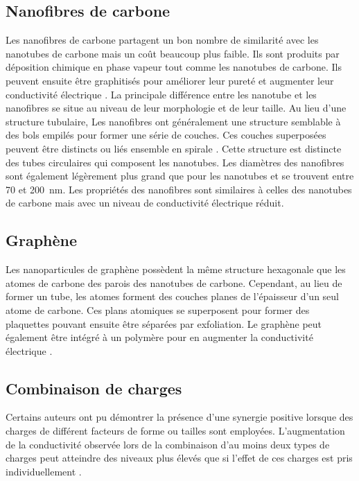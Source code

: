 \subsection{Nanofibres de carbone}

Les nanofibres de carbone partagent un bon nombre de similarité avec les nanotubes de carbone mais un coût beaucoup plus faible. 
Ils sont produits par déposition chimique en phase vapeur tout comme les nanotubes de carbone. 
Ils peuvent ensuite être graphitisés pour améliorer leur pureté et augmenter leur conductivité électrique \cite{Al-Saleh2009c}. 
La principale différence entre les nanotube et les nanofibres se situe au niveau de leur morphologie et de leur taille. 
Au lieu d'une structure tubulaire, Les nanofibres ont généralement une structure semblable à des bols empilés pour former une série de couches. 
Ces couches superposées peuvent être distincts ou liés ensemble en spirale \cite{Al-Saleh2009c}. 
Cette structure est distincte des tubes circulaires qui composent les nanotubes. 
Les diamètres des nanofibres sont également légèrement plus grand que pour les nanotubes et se trouvent entre 70 et \SI{200}{\nano\metre}. 
Les propriétés des nanofibres sont similaires à celles des nanotubes de carbone mais avec un niveau de conductivité électrique réduit. 

\subsection{Graphène}

Les nanoparticules de graphène possèdent la même structure hexagonale que les atomes de carbone des parois des nanotubes de carbone. 
Cependant, au lieu de former un tube, les atomes forment des couches planes de l'épaisseur d'un seul atome de carbone. 
Ces plans atomiques se superposent pour former des plaquettes pouvant ensuite être séparées par exfoliation. 
Le graphène peut également être intégré à un polymère pour en augmenter la conductivité électrique \cite{Jin2013,Wu2012a,Dweiri2015}. 

\subsection{Combinaison de charges}

Certains auteurs ont pu démontrer la présence d'une synergie positive lorsque des charges de différent facteurs de forme ou tailles sont employées.
L'augmentation de la conductivité observée lors de la combinaison d'au moins deux types de charges peut atteindre des niveaux plus élevés que si l'effet de ces charges est pris individuellement \cite{Dweiri2015}. 


